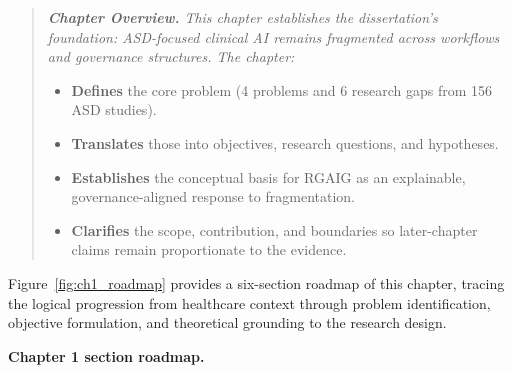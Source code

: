\label{sec:primary_data_instruments}
\label{sec:secondary_data_instruments}
\label{sec:conceptual_model}
\label{fig:conceptual_model}
\label{tab:research_blueprint}
\label{tab:literature_comparison}

\vspace{0.3em}

\noindent\begin{quote}\itshape\small
\textbf{\color{currentaccent}Chapter Overview.}
This chapter establishes the dissertation's foundation: ASD-focused clinical AI remains fragmented across workflows and governance structures. The chapter:
\begin{itemize}[leftmargin=*, itemsep=2pt]
    \item \textbf{Defines} the core problem (4 problems and 6 research gaps from 156 ASD studies).
    \item \textbf{Translates} those into objectives, research questions, and hypotheses.
    \item \textbf{Establishes} the conceptual basis for RGAIG as an explainable, governance-aligned response to fragmentation.
    \item \textbf{Clarifies} the scope, contribution, and boundaries so later-chapter claims remain proportionate to the evidence.
\end{itemize}
\end{quote}
\vspace{0.5em}


\noindent Figure~\ref{fig:ch1_roadmap} provides a six-section roadmap of this chapter, tracing the logical progression from healthcare context through problem identification, objective formulation, and theoretical grounding to the research design.



\noindent\textbf{Chapter 1 section roadmap.}

